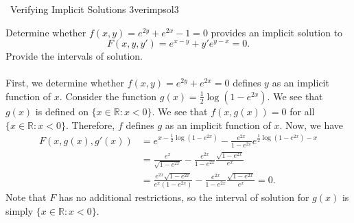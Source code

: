 \pagebreak

        \begin{example}{\Difficulty\,\Difficulty\,\,Verifying Implicit Solutions 3}{verimpsol3}
                    
            Determine whether \(f(x,y)=e^{2y}+e^{2x}-1=0\) provides an implicit solution to
            \begin{equation*}
                F(x,y,y')=e^{x-y}+y'e^{y-x}=0.
            \end{equation*}
            Provide the intervals of solution.
            \\
            \\
            First, we determine whether \(f(x,y)=e^{2y}+e^{2x}=0\) defines \(y\) as an implicit function of \(x\). Consider the function \(g(x)=\frac{1}{2}\log(1-e^{2x})\). We see that \(g(x)\) is defined on \(\{x\in\mathbb{R}:x<0\}\). We see that \(f(x,g(x))=0\) for all \(\{x\in\mathbb{R}:x<0\}\). Therefore, \(f\) defines \(g\) as an implicit function of \(x\). Now, we have
            \begin{align*}
                F(x,g(x),g'(x))&=e^{x-\frac{1}{2}\log(1-e^{2x})}-\frac{e^{2x}}{1-e^{2x}}e^{\frac{1}{2}\log(1-e^{2x})-x} \\
                &=\frac{e^x}{\sqrt{1-e^{2x}}}-\frac{e^{2x}}{1-e^{2x}}\frac{\sqrt{1-e^{2x}}}{e^x} \\
                &=\frac{e^{2x}\sqrt{1-e^{2x}}}{e^x(1-e^{2x})}-\frac{e^{2x}}{1-e^{2x}}\frac{\sqrt{1-e^{2x}}}{e^x}=0.
            \end{align*}
            Note that \(F\) has no additional restrictions, so the interval of solution for \(g(x)\) is simply \(\{x\in\mathbb{R}:x<0\}\).
            
        \end{example}
        \pagebreak
